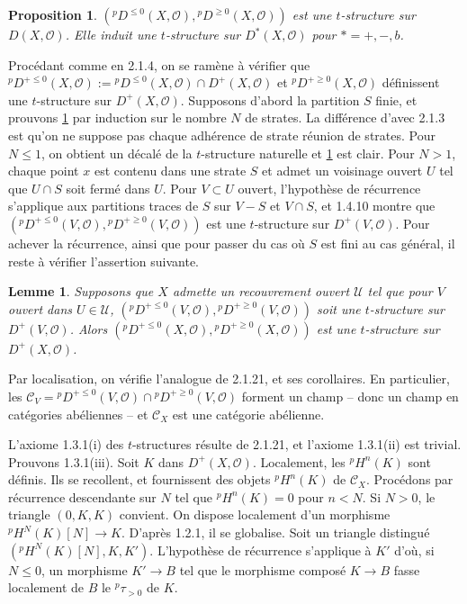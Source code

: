 \documentclass[12pt,a4paper]{article}
\theoremstyle{plain}
\newtheorem{lemma}[theorem]{Lemme}
\newtheorem{proposition}[theorem]{Proposition}
\theoremstyle{definition}
\newcommand{\cC}{\mathcal{C}}
\newcommand{\cO}{\mathcal{O}}
\newcommand{\cU}{\mathcal{U}}
\providecommand{\cC}{\mathcal{C}}
\providecommand{\cO}{\mathcal{O}}
\providecommand{\cU}{\mathcal{U}}
\begin{document}
\begin{proposition}\label{prop:3.2.20}
$({}^{p}D^{\leq 0}(X,\cO), {}^{p}D^{\geq 0}(X,\cO))$ est une $t$-structure sur $D(X,\cO)$. Elle induit une $t$-structure sur $D^{*}(X,\cO)$ pour $* = +, -, b$.
\end{proposition}

Proc\'{e}dant comme en 2.1.4, on se ram\`{e}ne \`{a} v\'{e}rifier que ${}^{p}D^{+ \leq 0}(X,\cO) := {}^{p}D^{\leq 0}(X,\cO) \cap D^{+}(X,\cO)$ et ${}^{p}D^{+ \geq 0}(X,\cO)$ d\'{e}finissent une $t$-structure sur $D^{+}(X,\cO)$. Supposons d'abord la partition $S$ finie, et prouvons \ref{prop:3.2.20} par induction sur le nombre $N$ de strates. La diff\'{e}rence d'avec 2.1.3 est qu'on ne suppose pas chaque adh\'{e}rence de strate r\'{e}union de strates. Pour $N \leq 1$, on obtient un d\'{e}cal\'{e} de la $t$-structure naturelle et \ref{prop:3.2.20} est clair. Pour $N > 1$, chaque point $x$ est contenu dans une strate $S$ et admet un voisinage ouvert $U$ tel que $U \cap S$ soit ferm\'{e} dans $U$. Pour $V \subset U$ ouvert, l'hypoth\`{e}se de r\'{e}currence s'applique aux partitions traces de $S$ sur $V-S$ et $V \cap S$, et 1.4.10 montre que $({}^{p}D^{+ \leq 0}(V,\cO), {}^{p}D^{+ \geq 0}(V,\cO))$ est une $t$-structure sur $D^{+}(V,\cO)$. Pour achever la r\'{e}currence, ainsi que pour passer du cas o\`{u} $S$ est fini au cas g\'{e}n\'{e}ral, il reste \`{a} v\'{e}rifier l'assertion suivante.

\begin{lemma}\label{lem:3.2.21}
Supposons que $X$ admette un recouvrement ouvert $\cU$ tel que pour $V$ ouvert dans $U \in \cU$, $({}^{p}D^{+ \leq 0}(V,\cO), {}^{p}D^{+ \geq 0}(V,\cO))$ soit une $t$-structure sur $D^{+}(V,\cO)$. Alors $({}^{p}D^{+ \leq 0}(X,\cO), {}^{p}D^{+ \geq 0}(X,\cO))$ est une $t$-structure sur $D^{+}(X,\cO)$.
\end{lemma}

Par localisation, on v\'{e}rifie l'analogue de 2.1.21, et ses corollaires. En particulier, les $\cC_{V} = {}^{p}D^{+ \leq 0}(V,\cO) \cap {}^{p}D^{+ \geq 0}(V,\cO)$ forment un champ -- donc un champ en cat\'{e}gories ab\'{e}liennes -- et $\cC_{X}$ est une cat\'{e}gorie ab\'{e}lienne.

L'axiome 1.3.1(i) des $t$-structures r\'{e}sulte de 2.1.21, et l'axiome 1.3.1(ii) est trivial. Prouvons 1.3.1(iii). Soit $K$ dans $D^{+}(X,\cO)$. Localement, les ${}^{p}H^{n}(K)$ sont d\'{e}finis. Ils se recollent, et fournissent des objets ${}^{p}H^{n}(K)$ de $\cC_{X}$. Proc\'{e}dons par r\'{e}currence descendante sur $N$ tel que ${}^{p}H^{n}(K) = 0$ pour $n < N$. Si $N > 0$, le triangle $(0,K,K)$ convient. On dispose localement d'un morphisme ${}^{p}H^{N}(K)[N] \to K$. D'apr\`{e}s 1.2.1, il se globalise. Soit un triangle distingu\'{e} $({}^{p}H^{N}(K)[N], K, K')$. L'hypoth\`{e}se de r\'{e}currence s'applique \`{a} $K'$ d'o\`{u}, si $N \leq 0$, un morphisme $K' \to B$ tel que le morphisme compos\'{e} $K \longrightarrow B$ fasse localement de $B$ le ${}^{p}\tau_{>0}$ de $K$.
\end{document}
